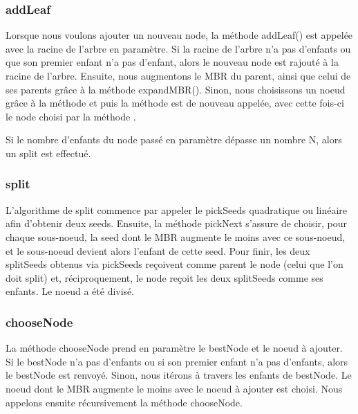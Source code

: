\documentclass[utf8]{article}
\begin{document}
\begin{large}
  \subsubsection{addLeaf}\label{addLeaf}
  \indent
  \par
  Lorsque nous voulons ajouter un nouveau node, la méthode addLeaf() est appelée
  avec la racine de l'arbre en paramètre. Si la racine de l'arbre n'a pas
  d'enfants ou que son premier enfant n'a pas d'enfant, alors le nouveau node
  est rajouté à la racine de l'arbre. Ensuite, nous augmentons le MBR du parent,
  ainsi que celui de ses parents grâce à la méthode expandMBR(). Sinon, nous
  choisissons un noeud grâce à la méthode  et puis la méthode 
  est de nouveau appelée, avec cette fois-ci le node choisi par la méthode
  .
  \par
  \indent
  Si le nombre d'enfants du node passé en paramètre dépasse un nombre N, alors
  un split est effectué.
  \par
  \subsubsection{split}\label{split}
  \indent
  \par
  L'algorithme de split commence par appeler le pickSeeds quadratique ou
  linéaire afin d'obtenir deux seeds. \newline Ensuite, la
  méthode pickNext s'assure de choisir, pour chaque sous-noeud, la seed dont le
  MBR augmente le moins avec ce sous-noeud, et le sous-noeud devient alors
  l'enfant de cette seed. \newline Pour finir, les deux splitSeeds obtenus via
  pickSeeds reçoivent comme parent le node (celui que l'on doit split) et,
  réciproquement, le node reçoit les deux splitSeeds comme ses enfants. Le noeud
  a été divisé.
  \par

  \subsubsection{chooseNode}\label{chooseNode}
  \indent
  \par
  La méthode chooseNode prend en paramètre le bestNode et le noeud à ajouter.
  Si le bestNode n'a pas d'enfants ou si son premier enfant n'a pas d'enfants,
  alors le bestNode est renvoyé. Sinon, nous itérons à travers les enfants de
  bestNode. Le noeud dont le MBR augmente le moins avec le noeud à ajouter est
  choisi. Nous appelons ensuite récursivement la méthode chooseNode.


\end{large}
\end{document}
